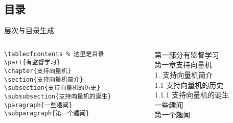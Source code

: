 \subsection{目录}
    \begin{frame}[fragile]{层次与目录生成}
    \begin{columns}
    \begin{column}{.6\textwidth}
    \lstset{language=[LaTeX]TeX}
    \begin{lstlisting}[basicstyle=\ttfamily\small]
\tableofcontents % 这里是目录
\part{有监督学习}
\chapter{支持向量机}
\section{支持向量机简介}
\subsection{支持向量机的历史}
\subsubsection{支持向量机的诞生}
\paragraph{一些趣闻}
\subparagraph{第一个趣闻}
    \end{lstlisting}
    \end{column}
    \begin{column}{.4\textwidth}
    第一部分\quad 有监督学习\\
    第一章\quad 支持向量机 \\
    1. 支持向量机简介 \\
    1.1 支持向量机的历史 \\
    1.1.1 支持向量机的诞生 \\
    一些趣闻  \\
    第一个趣闻
    \end{column}
    \end{columns}
    
    \end{frame}

